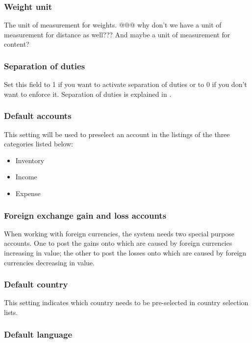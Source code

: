 \subsubsection{Weight unit}
   The unit of measurement for weights. @@@ why don't we have a unit of measurement for distance as well??? And maybe a unit of measurement for content?
   
\subsubsection{Separation of duties}

Set this field to 1 if you want to activate separation of duties or to 0 if you don't
want to enforce it. Separation of duties is explained in .

\subsubsection{Default accounts}

This setting will be used to preselect an account in
the listings of the three categories listed below:
\begin{itemize}
\item Inventory
\item Income
\item Expense
\end{itemize}


\subsubsection{Foreign exchange gain and loss accounts}

When working with foreign currencies,
the system needs two special purpose accounts. One to post the gains onto which are
caused by foreign currencies increasing in value; the other to post the losses onto
which are caused by foreign currencies decreasing in value.


\subsubsection{Default country}

This setting indicates which country needs to be pre-selected
   in country selection lists.


\subsubsection{Default language}

